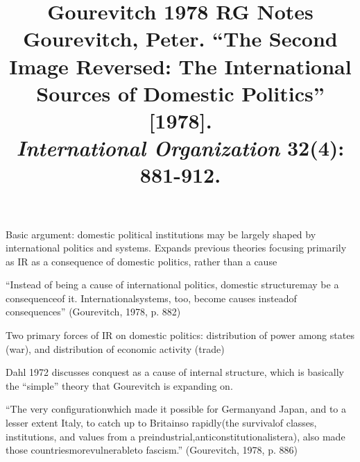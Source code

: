 \documentclass[12pt]{article}
\title{\textbf{Gourevitch 1978 RG Notes}\\
\large Gourevitch, Peter. ``The Second Image Reversed: The International Sources of Domestic Politics'' [1978].\\
\textit{International Organization} 32(4): 881-912.}
\author{}
\date{}
\begin{document}
\maketitle

Basic argument: domestic political institutions may be largely shaped by international politics and systems. Expands previous theories focusing primarily as IR as a consequence of domestic politics, rather than a cause

``Instead of being a cause of international politics, domestic structuremay be a consequenceof it. Internationalsystems, too, become causes insteadof consequences'' (Gourevitch, 1978, p. 882)

Two primary forces of IR on domestic politics: distribution of power among states (war), and distribution of economic activity (trade)

Dahl 1972 discusses conquest as a cause of internal structure, which is basically the ``simple'' theory that Gourevitch is expanding on.

``The very configurationwhich made it possible for Germanyand Japan, and to a lesser extent Italy, to catch up to Britainso rapidly(the survivalof classes, institutions, and values from a preindustrial,anticonstitutionalistera), also made those countriesmorevulnerableto fascism.'' (Gourevitch, 1978, p. 886)
\end{document}
